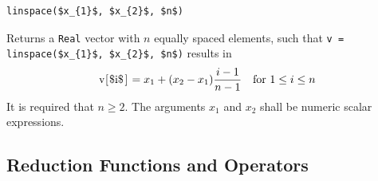 \begin{operatordefinition}[linspace]
\begin{synopsis}\begin{lstlisting}
linspace($x_{1}$, $x_{2}$, $n$)
\end{lstlisting}\end{synopsis}
\begin{semantics}
Returns a \lstinline!Real! vector with $n$ equally spaced elements, such that \lstinline!v = linspace($x_{1}$, $x_{2}$, $n$)! results in
\begin{equation*}
\text{\lstinline!v[$i$]!} = x_{1} + (x_{2} - x_{1}) \frac{i - 1}{n - 1} \quad \text{for $1 \leq i \leq n$}
\end{equation*}
It is required that $n \geq 2$.
The arguments $x_{1}$ and $x_{2}$ shall be numeric scalar expressions.
\end{semantics}
\end{operatordefinition}

\subsection{Reduction Functions and Operators}\label{reduction-functions-and-operators}

